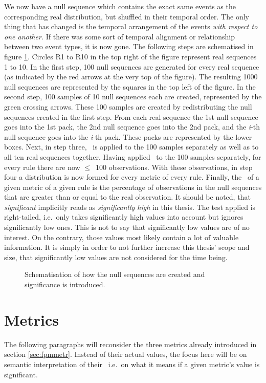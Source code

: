 We now have a null sequence which contains the exact same events as the corresponding real distribution, but shuffled in their temporal order.
The only thing that has changed is the temporal arrangement of the events \emph{with respect to one another.}
If there was some sort of temporal alignment or relationship between two event types, it is now gone.
The following steps are schematised in figure \ref{fig:sig}.
Circles R1 to R10 in the top right of the figure represent real sequences 1 to 10.
In the first step, 100 null sequences are generated for every real sequence (as indicated by the red arrows at the very top of the figure).
The resulting 1000 null sequences are represented by the squares in the top left of the figure.
In the second step, 100 samples of 10 null sequences each are created, represented by the green crossing arrows.
These 100 samples are created by redistributing the null sequences created in the first step.
From each real sequence the 1st null sequence goes into the 1st pack, the 2nd null sequence goes into the 2nd pack, and the \emph{i}-th null sequence goes into the \emph{i}-th pack.
These packs are represented by the lower boxes.
Next, in step three, \fpmlower\ is applied to the 100 samples separately as well as to all ten real sequences together.
Having applied \fpmlower\ to the 100 samples separately, for every rule there are now \(\leq\)~100 observations.
With these observations, in step four a distribution is now formed for every metric of every rule.
Finally, the \pv\ of a given metric of a given rule is the percentage of observations in the null sequences that are greater than or equal to the real observation.
It should be noted, that \emph{significant} implicitly reads as \emph{significantly high} in this thesis.
The test applied is right-tailed, i.e.~only takes significantly high values into account but ignores significantly low ones.
This is not to say that significantly low values are of no interest.
On the contrary, those values most likely contain a lot of valuable information.
It is simply in order to not further increase this thesis' scope and size, that significantly low values are not considered for the time being.

\begin{figure}
	\centering
	
	\label{fig:sig}
	\caption[Introducing significance.]{Schematisation of how the null sequences are created and significance is introduced.}
\end{figure}

\section{Metrics}
\label{sec:sigmetr}
The following paragraphs will reconsider the three metrics already introduced in section \ref{sec:fpmmetr}.
Instead of their actual values, the focus here will be on semantic interpretation of their \pv\, i.e.~on what it means if a given metric's value is significant.

